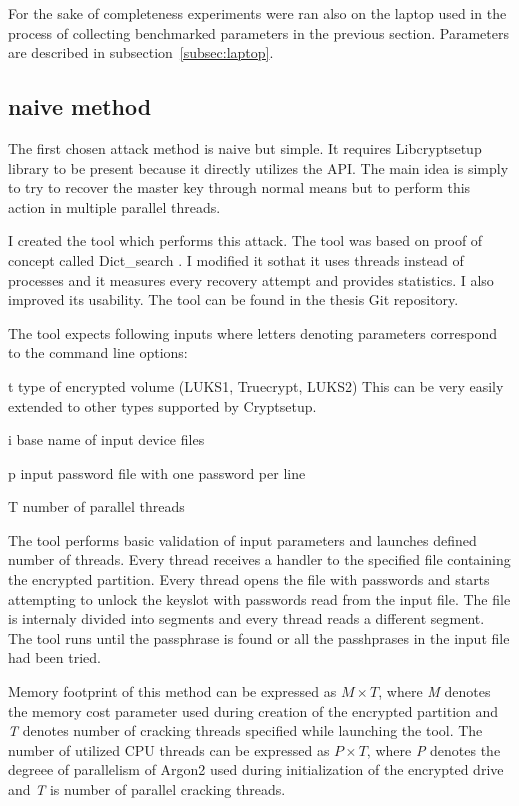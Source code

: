 \documentclass[nolof]{fithesis3}
\begin{document}
For the sake of completeness experiments were ran also on the laptop used in the process of collecting benchmarked parameters in the previous section. Parameters are described in subsection~\ref{subsec:laptop}.

\subsection{naive method}
The first chosen attack method is naive but simple. It requires Libcryptsetup library to be present because it directly utilizes the API. The main idea is simply to try to recover the master key through normal means but to perform this action in multiple parallel threads.

I created the tool which performs this attack. The tool was based on proof of concept called Dict\_search \parencite{cryptsetupdictsearch}.  I modified it sothat it uses threads instead of processes and it measures every recovery attempt and provides statistics. I also improved its usability. The tool can be found in the thesis Git repository.


The tool expects following inputs where letters denoting parameters correspond to the command line options:

\begin{description}
\item{t} type of encrypted volume (LUKS1, Truecrypt, LUKS2) This can be very easily extended to other types supported by Cryptsetup.

\item{i} base name of input device files

\item{p} input password file with one password per line

\item{T} number of parallel threads
\end{description}

The tool performs basic validation of input parameters and launches defined number of threads. Every thread receives a handler to the specified file containing the encrypted partition. Every thread opens the file with passwords and starts attempting to unlock the keyslot with passwords read from the input file. The file is internaly divided into segments and every thread reads a different segment. The tool runs until the passphrase is found or all the passhprases in the input file had been tried.

Memory footprint of this method can be expressed as $M \times T$, where \emph{M} denotes the memory cost parameter used during creation of the encrypted partition and \emph{T} denotes number of cracking threads specified while launching the tool. The number of utilized CPU threads can be expressed as $P \times T$, where \emph{P} denotes the degreee of parallelism of Argon2 used during initialization of the encrypted drive and \emph{T} is number of parallel cracking threads.
\end{document}
